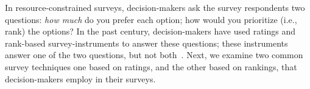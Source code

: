 In resource-constrained surveys, decision-makers ask the survey respondents two questions: \textit{how much} do you prefer each option; how would you prioritize (i.e., rank) the options? In the past century, decision-makers have used ratings and rank-based survey-instruments to answer these questions; these instruments answer one of the two questions, but not both~\cite{moors2016two}.  Next, we examine two common survey techniques one based on ratings, and the other based on rankings, that decision-makers employ in their surveys.










